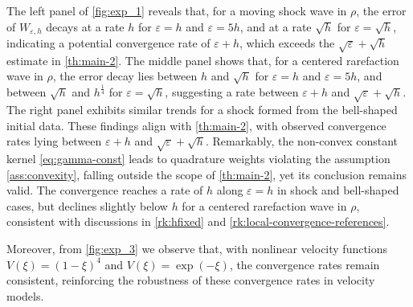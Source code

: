 \documentclass[10pt]{amsart}
\theoremstyle{plain}
\theoremstyle{definition}
\numberwithin{equation}{section}
\newcommand{\eps}{{\varepsilon}}
\begin{document}
The left panel of \cref{fig:exp_1} reveals that, for a moving shock wave in $\rho$, the error of $W_{\varepsilon,h}$ decays at a rate $h$ for $\varepsilon=h$ and $\varepsilon=5h$, and at a rate $\sqrt{h}$ for $\varepsilon=\sqrt{h}$, indicating a potential convergence rate of $\eps+h$, which exceeds the $\sqrt{\varepsilon}+\sqrt{h}$ estimate in \cref{th:main-2}. The middle panel shows that, for a centered rarefaction wave in $\rho$, the error decay lies between $h$ and $\sqrt{h}$ for $\varepsilon=h$ and $\varepsilon=5h$, and between $\sqrt{h}$ and $h^{\frac14}$ for $\varepsilon=\sqrt{h}$, suggesting a rate between $\varepsilon+h$ and $\sqrt{\varepsilon}+\sqrt{h}$. The right panel exhibits similar trends for a shock formed from the bell-shaped initial data. These findings align with \cref{th:main-2}, with observed convergence rates lying between $\varepsilon+h$ and $\sqrt{\varepsilon}+\sqrt{h}$. Remarkably, the non-convex constant kernel \cref{eq:gamma-const} leads to quadrature weights violating the assumption \cref{ass:convexity}, falling outside the scope of \cref{th:main-2}, yet its conclusion remains valid. The convergence reaches a rate of $h$ along $\varepsilon=h$ in shock and bell-shaped cases, but declines slightly below $h$ for a centered rarefaction wave in $\rho$, consistent with discussions in \cref{rk:hfixed} and \cref{rk:local-convergence-references}.

Moreover, from \cref{fig:exp_3} we observe that, with nonlinear velocity functions $V(\xi)=(1-\xi)^4$ and $V(\xi)=\exp(-\xi)$, the convergence rates remain consistent, reinforcing the robustness of these convergence rates in velocity models.
\end{document}
